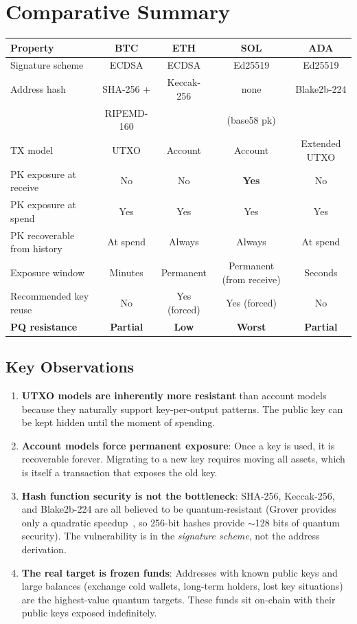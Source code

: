 \section{Comparative Summary}


\begin{center}
\begin{tabular}{lcccc}
\toprule
\textbf{Property} & \textbf{BTC} & \textbf{ETH} & \textbf{SOL} &
  \textbf{ADA} \\
\midrule
Signature scheme & ECDSA & ECDSA & Ed25519 & Ed25519 \\
Address hash & SHA-256 + & Keccak-256 & none & Blake2b-224 \\
 & RIPEMD-160 & & (base58 pk) & \\
TX model & UTXO & Account & Account & Extended UTXO \\
PK exposure at receive & No & No & \textbf{Yes} & No \\
PK exposure at spend & Yes & Yes & Yes & Yes \\
PK recoverable from history & At spend & Always & Always & At spend \\
Exposure window & Minutes & Permanent & Permanent (from receive) & Seconds \\
Recommended key reuse & No & Yes (forced) & Yes (forced) & No \\
\midrule
\textbf{PQ resistance} & \textbf{Partial} & \textbf{Low} &
  \textbf{Worst} & \textbf{Partial} \\
\bottomrule
\end{tabular}
\end{center}

\subsection{Key Observations}

\begin{enumerate}[nosep]
  \item \textbf{UTXO models are inherently more resistant} than account
        models because they naturally support key-per-output patterns.
        The public key can be kept hidden until the moment of spending.
  \item \textbf{Account models force permanent exposure}: Once a key
        is used, it is recoverable forever. Migrating to a new key
        requires moving all assets, which is itself a transaction that
        exposes the old key.
  \item \textbf{Hash function security is not the bottleneck}: SHA-256,
        Keccak-256, and Blake2b-224 are all believed to be
        quantum-resistant (Grover provides only a quadratic
        speedup~\cite{grover1996}, so 256-bit hashes provide $\sim$128
        bits of quantum security). The vulnerability is in the
        \emph{signature scheme}, not the address derivation.
  \item \textbf{The real target is frozen funds}: Addresses with known
        public keys and large balances (exchange cold wallets, long-term
        holders, lost key situations) are the highest-value quantum
        targets. These funds sit on-chain with their public keys
        exposed indefinitely.
\end{enumerate}

